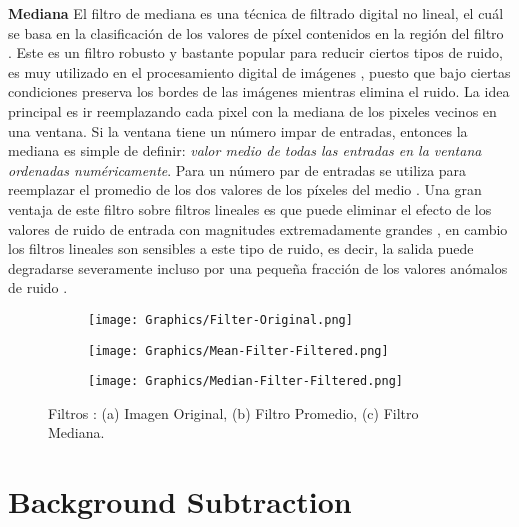 \textbf{Mediana}
El filtro de mediana es una técnica de filtrado digital no lineal, el cuál se basa en la clasificación de los valores de píxel contenidos en la región del filtro \cite{MandarMeghana}. Este es un filtro robusto y bastante popular para reducir ciertos tipos de ruido, es muy utilizado en el procesamiento digital de imágenes \cite{RuchikaGaurav}, puesto que bajo ciertas condiciones preserva los bordes de las imágenes mientras elimina el ruido. La idea principal es ir reemplazando cada pixel con la mediana de los pixeles vecinos en una ventana. Si la ventana tiene un número impar de entradas, entonces la mediana es simple de definir: \textit{valor medio de todas las entradas en la ventana ordenadas numéricamente}. Para un número par de entradas se utiliza para reemplazar el promedio de los dos valores de los píxeles del medio \cite{PawanManojSumitAshok}. Una gran ventaja de este filtro sobre filtros lineales es que puede eliminar el efecto de los valores de ruido de entrada con magnitudes extremadamente grandes \cite{MandarMeghana}, en cambio los filtros lineales son sensibles a este tipo de ruido, es decir, la salida puede degradarse severamente incluso por una pequeña fracción de los valores anómalos de ruido \cite{JamesYixinStephen, PawanManojSumitAshok}.

\begin{figure}[h!]
    \centering
    \begin{subfigure}[b]{0.32\linewidth}
        \centering
	    \texttt{[image: Graphics/Filter-Original.png]}
        \caption{}
    \end{subfigure}
    \begin{subfigure}[b]{0.32\linewidth}
        \centering
	    \texttt{[image: Graphics/Mean-Filter-Filtered.png]}
        \caption{}
    \end{subfigure}    
    \begin{subfigure}[b]{0.32\linewidth}
        \centering
	    \texttt{[image: Graphics/Median-Filter-Filtered.png]}
        \caption{}
    \end{subfigure}    
    \caption{Filtros : (a) Imagen Original, (b) Filtro Promedio, (c) Filtro Mediana.}
    \label{fig:filters}
\end{figure}    

\section{Background Subtraction}

